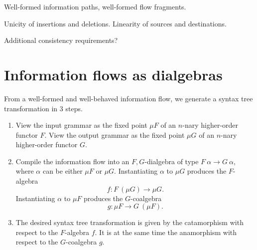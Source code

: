 \documentclass{amsart}
\gdef\R{\rightarrow}
\begin{document}
Well-formed information paths, well-formed flow fragments.

Unicity of insertions and deletions. Linearity of sources and
destinations.

Additional consistency requirements?


\section{Information flows as dialgebras}

From a well-formed and well-behaved information flow, we generate
a syntax tree transformation in 3 steps.
\begin{enumerate}
\item View the input grammar as the fixed point $\mu F$ of an
$n$-nary higher-order functor $F$. View the output grammar as the
fixed point $\mu G$ of an $n$-nary higher-order functor $G$.
\item Compile the information flow into an $F,G$-dialgebra of
type $F~\alpha\R G~\alpha$, where $\alpha$ can be either $\mu F$
or $\mu G$. Instantiating $\alpha$ to $\mu G$ produces the
$F$-algebra
\[
f : F~(\mu G) \R \mu G.
\]
Instantiating $\alpha$ to $\mu F$ produces the $G$-coalgebra
\[
g : \mu F \R G~(\mu F).
\]
\item The desired syntax tree transformation is given by the
catamorphism with respect to the $F$-algebra $f$. It is at the
same time the anamorphism with respect to the $G$-coalgebra $g$.
\end{enumerate}
\end{document}
